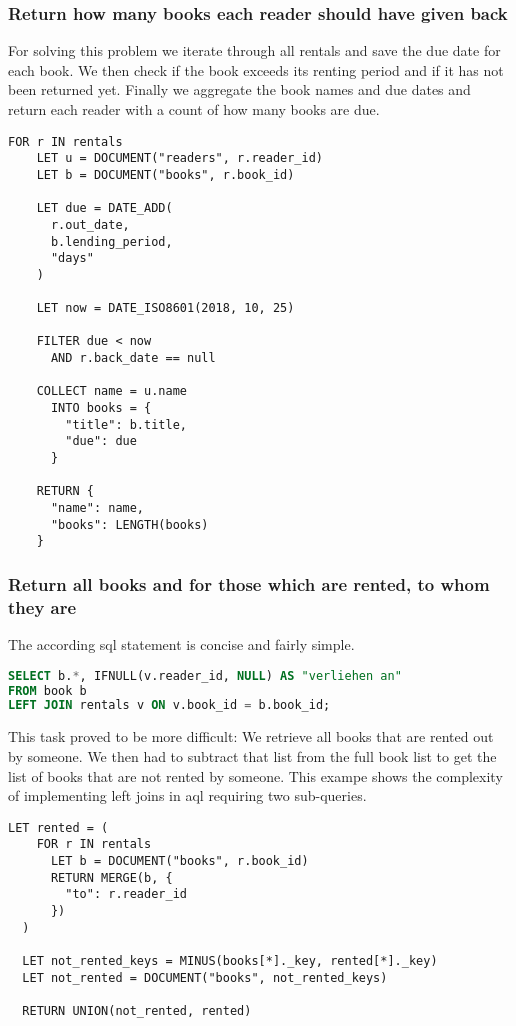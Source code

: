 \subsubsection{Return how many books each reader should have given back}

For solving this problem we iterate through all rentals and save the due date for each book. We then check if the book exceeds its renting period and if it has not been returned yet. Finally we aggregate the book names and due dates and return each reader with a count of how many books are due.

\begin{lstlisting}[language=ArangoQL]
  FOR r IN rentals
    LET u = DOCUMENT("readers", r.reader_id)
    LET b = DOCUMENT("books", r.book_id)

    LET due = DATE_ADD(
      r.out_date,
      b.lending_period,
      "days"
    )

    LET now = DATE_ISO8601(2018, 10, 25)
    
    FILTER due < now
      AND r.back_date == null
    
    COLLECT name = u.name
      INTO books = {
        "title": b.title,
        "due": due
      }

    RETURN {
      "name": name,
      "books": LENGTH(books)
    }
\end{lstlisting}

\subsubsection{Return all books and for those which are rented, to whom they are}

The according \gls{sql} statement is concise and fairly simple.

\begin{lstlisting}[language=sql]
SELECT b.*, IFNULL(v.reader_id, NULL) AS "verliehen an"
FROM book b
LEFT JOIN rentals v ON v.book_id = b.book_id;
\end{lstlisting}

This task proved to be more difficult: We retrieve all books that are rented out by someone. We then had to subtract that list from the full book list to get the list of books that are not rented by someone. This exampe shows the complexity of implementing left joins in \gls{aql} requiring two sub-queries.

\begin{lstlisting}[language=ArangoQL]
  LET rented = (
    FOR r IN rentals
      LET b = DOCUMENT("books", r.book_id)
      RETURN MERGE(b, {
        "to": r.reader_id
      })
  )

  LET not_rented_keys = MINUS(books[*]._key, rented[*]._key)
  LET not_rented = DOCUMENT("books", not_rented_keys)

  RETURN UNION(not_rented, rented)
\end{lstlisting}

